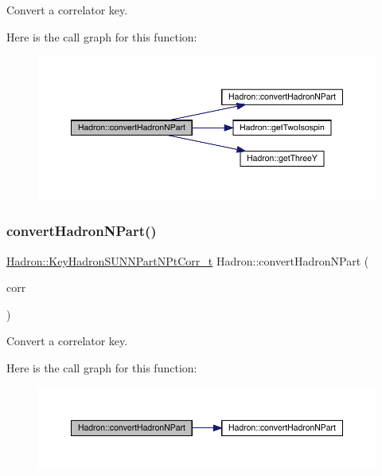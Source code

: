 Convert a correlator key. 

Here is the call graph for this function\+:
\nopagebreak
\begin{figure}[H]
\begin{center}
\leavevmode
\includegraphics[width=350pt]{d1/daf/namespaceHadron_a870585feaeca280be18774aa6242e2e9_cgraph}
\end{center}
\end{figure}
\mbox{\label{namespaceHadron_af69200410e93c702cf9e19f0c220bbef}} 
\subsubsection{\texorpdfstring{convertHadronNPart()}{convertHadronNPart()}\hspace{0.1cm}{\footnotesize\ttfamily [3/3]}}
{\footnotesize\ttfamily \mbox{\hyperlink{structHadron_1_1KeyHadronSUNNPartNPtCorr__t}{Hadron\+::\+Key\+Hadron\+S\+U\+N\+N\+Part\+N\+Pt\+Corr\+\_\+t}} Hadron\+::convert\+Hadron\+N\+Part (\begin{DoxyParamCaption}\item[{const \mbox{\hyperlink{structHadron_1_1KeyHadronNPartNPtCorr__t}{Key\+Hadron\+N\+Part\+N\+Pt\+Corr\+\_\+t}} \&}]{corr }\end{DoxyParamCaption})}



Convert a correlator key. 

Here is the call graph for this function\+:
\nopagebreak
\begin{figure}[H]
\begin{center}
\leavevmode
\includegraphics[width=350pt]{d1/daf/namespaceHadron_af69200410e93c702cf9e19f0c220bbef_cgraph}
\end{center}
\end{figure}
\mbox{\label{namespaceHadron_acca1db731e7341c6fce2d78c3442c739}} 
